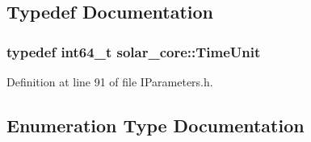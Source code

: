 \subsection{Typedef Documentation}
\hypertarget{namespacesolar__core_a4b5949d07259da6f8a20d12a30403e90}{}
\subsubsection[{Time\+Unit}]{\setlength{\rightskip}{0pt plus 5cm}typedef int64\+\_\+t {\bf solar\+\_\+core\+::\+Time\+Unit}}\label{namespacesolar__core_a4b5949d07259da6f8a20d12a30403e90}


Definition at line 91 of file I\+Parameters.\+h.



\subsection{Enumeration Type Documentation}
\hypertarget{namespacesolar__core_aa1147341e5ef7a40d68d1bd68e149362}{}
